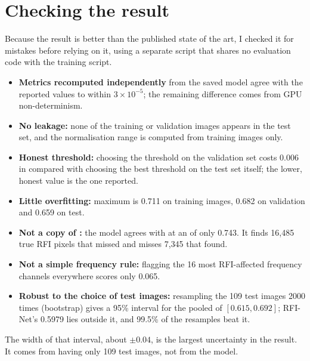 \section{Checking the result}
\label{sec:audit}
Because the result is better than the published state of the art, I checked
it for mistakes before relying on it, using a separate script that shares no
evaluation code with the training script.
\begin{itemize}
  \item \textbf{Metrics recomputed independently} from the saved model agree
    with the reported values to within $3\times10^{-5}$; the remaining
    difference comes from GPU non-determinism.
  \item \textbf{No leakage:} none of the training or validation images appears
    in the test set, and the normalisation range is computed from training
    images only.
  \item \textbf{Honest threshold:} choosing the threshold on the validation set
    costs 0.006 in \Fone{} compared with choosing the best threshold on the
    test set itself; the lower, honest value is the one reported.
  \item \textbf{Little overfitting:} maximum \Fone{} is 0.711 on training
    images, 0.682 on validation and 0.659 on test.
  \item \textbf{Not a copy of \aoflagger{}:} the model agrees with \aoflagger{}
    at an \Fone{} of only 0.743. It finds 16{,}485 true RFI pixels that
    \aoflagger{} missed and misses 7{,}345 that \aoflagger{} found.
  \item \textbf{Not a simple frequency rule:} flagging the 16 most
    RFI-affected frequency channels everywhere scores only 0.065.
  \item \textbf{Robust to the choice of test images:} resampling the 109 test
    images 2000 times (bootstrap) gives a 95\% interval for the pooled \Fone{}
    of $[0.615, 0.692]$; RFI-Net's 0.5979 lies outside it, and 99.5\% of the
    resamples beat it.
\end{itemize}
The width of that interval, about $\pm0.04$, is the largest uncertainty in the
result. It comes from having only 109 test images, not from the model.
